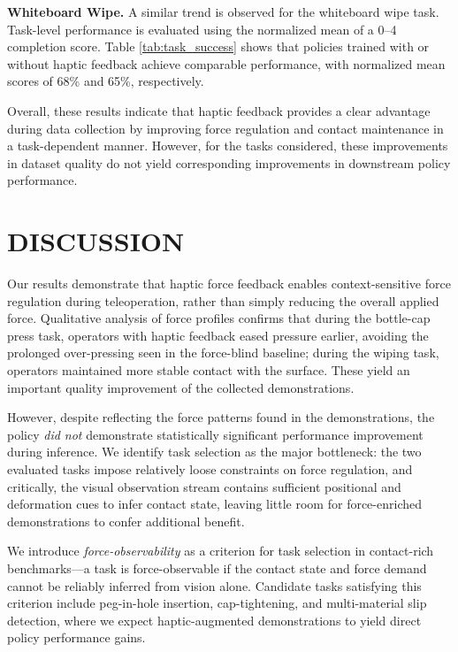 \documentclass[letterpaper, 10 pt, conference]{ieeeconf}  %
\begin{document}
\textbf{Whiteboard Wipe.} 
A similar trend is observed for the whiteboard wipe task. Task-level performance is evaluated using the normalized mean of a 0--4 completion score. Table \ref{tab:task_success} shows that policies trained with or without haptic feedback achieve comparable performance, with normalized mean scores of 68\% and 65\%, respectively. 

Overall, these results indicate that haptic feedback provides a clear advantage during data collection by improving force regulation and contact maintenance in a task-dependent manner. However, for the tasks considered, these improvements in dataset quality do not yield corresponding improvements in downstream policy performance.

\section{DISCUSSION}

Our results demonstrate that haptic force feedback enables context-sensitive force regulation during teleoperation, rather than simply reducing the overall applied force. 
Qualitative analysis of force profiles confirms that during the bottle-cap press task, operators with haptic feedback eased pressure earlier, avoiding the prolonged over-pressing seen in the force-blind baseline; during the wiping task, operators maintained more stable contact with the surface. 
These yield an important quality improvement of the collected demonstrations.

However, despite reflecting the force patterns found in the demonstrations, the policy \textit{did not} demonstrate statistically significant performance improvement during inference. We identify task selection as the major bottleneck: the two evaluated tasks impose relatively loose constraints on force regulation, and critically, the visual observation stream contains sufficient positional and deformation cues to infer contact state, leaving little room for force-enriched demonstrations to confer additional benefit. 

We introduce \textit{force-observability} as a criterion for task selection in contact-rich benchmarks---a task is force-observable if the contact state and force demand cannot be reliably inferred from vision alone. 
Candidate tasks satisfying this criterion include peg-in-hole insertion, cap-tightening, and multi-material slip detection, where we expect haptic-augmented demonstrations to yield direct policy performance gains.
\end{document}
